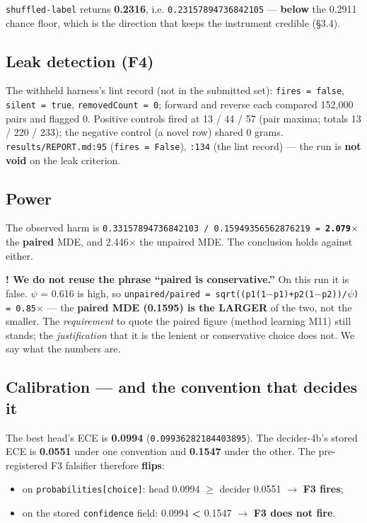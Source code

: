 \documentclass[10pt]{article}
\begin{document}
\texttt{shuffled-label} returns \textbf{0.2316}, i.e. \texttt{0.23157894736842105} --- \textbf{below} the 0.2911 chance floor, which is the direction that keeps the instrument credible (\S3.4).

\subsection{Leak detection (F4)}

The withheld harness's lint record (not in the submitted set): \texttt{fires = false}, \texttt{silent = true}, \texttt{removedCount = 0}; forward and reverse each compared 152,000 pairs and flagged 0. Positive controls fired at 13 / 44 / 57 (pair maxima; totals 13 / 220 / 233); the negative control (a novel row) shared 0 grams. \texttt{results/REPORT.md:95} (\texttt{fires = False}), \texttt{:134} (the lint record) --- the run is \textbf{not void} on the leak criterion.

\subsection{Power}

The observed harm is \texttt{0.33157894736842103 / 0.15949356562876219 = \textbf{2.079$\times$}} the \textbf{paired} MDE, and 2.446$\times$ the unpaired MDE. The conclusion holds against either.

\textbf{! We do not reuse the phrase ``paired is conservative.''} On this run it is false. $\psi$ = 0.616 is high, so \texttt{unpaired/paired = sqrt((p1(1$-$p1)+p2(1$-$p2))/$\psi$) = 0.85$\times$} --- the \textbf{paired MDE (0.1595) is the LARGER} of the two, not the smaller. The \emph{requirement} to quote the paired figure (method learning M11) still stands; the \emph{justification} that it is the lenient or conservative choice does not. We say what the numbers are.

\subsection{Calibration --- and the convention that decides it}

The best head's ECE is \textbf{0.0994} (\texttt{0.09936282184403895}). The decider-4b's stored ECE is \textbf{0.0551} under one convention and \textbf{0.1547} under the other. The pre-registered F3 falsifier therefore \textbf{flips}:

\begin{itemize}
\item on \texttt{probabilities[choice]}: head 0.0994 \textbf{$\ge$} decider 0.0551 $\to$ \textbf{F3 fires};
\item on the stored \texttt{confidence} field: 0.0994 \textbf{<} 0.1547 $\to$ \textbf{F3 does not fire}.
\end{itemize}
\end{document}
